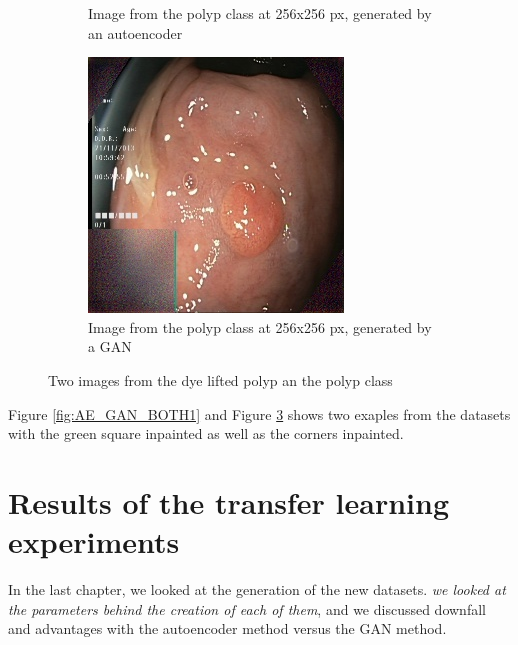 \begin{figure}
\begin{subfigure}[t]{0.4\textwidth}
            \caption{Image from the polyp class at 256x256 px, generated by an autoencoder }    
            \label{fig:p_AE_BOTH2}
        \end{subfigure}
        \qquad%
        \begin{subfigure}[t]{0.4\textwidth}   
            \centering 
            \includegraphics[width=\textwidth]{experiments/figures/both/greenGAN.jpg}
            \caption{Image from the polyp class at 256x256 px, generated by a GAN\\ }    
            \label{fig:p_GAN_BOTH2}
        \end{subfigure}
        \caption{Two images from the dye lifted polyp an the polyp class} 
        \label{fig:AE_GAN_BOTH2}
    \end{figure}

Figure \ref{fig:AE_GAN_BOTH1} and Figure \ref{fig:AE_GAN_BOTH2} shows two exaples from the datasets with the green square inpainted as well as the corners inpainted.


   
\FloatBarrier

\section{Results of the transfer learning experiments}
In the last chapter, we looked at the generation of the new datasets. \textit{we looked at the parameters behind the creation of each of them}, and we discussed downfall and advantages with the autoencoder method versus the GAN method. 

